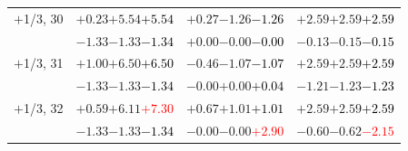 \documentclass[compress]{beamer}
\begin{document}
\begin{frame}
\begin{tabular}{r | c | c | c}
$+$1/3, 30 & $+0.23$\hspace{0.1 cm}$+5.54$\hspace{0.1 cm}\textcolor{black}{$+5.54$} & $+0.27$\hspace{0.1 cm}$-1.26$\hspace{0.1 cm}\textcolor{black}{$-1.26$} & $+2.59$\hspace{0.1 cm}$+2.59$\hspace{0.1 cm}\textcolor{black}{$+2.59$} \\
           & $-1.33$\hspace{0.1 cm}$-1.33$\hspace{0.1 cm}\textcolor{black}{$-1.34$} & $+0.00$\hspace{0.1 cm}$-0.00$\hspace{0.1 cm}\textcolor{black}{$-0.00$} & $-0.13$\hspace{0.1 cm}$-0.15$\hspace{0.1 cm}\textcolor{black}{$-0.15$} \\
$+$1/3, 31 & $+1.00$\hspace{0.1 cm}$+6.50$\hspace{0.1 cm}\textcolor{black}{$+6.50$} & $-0.46$\hspace{0.1 cm}$-1.07$\hspace{0.1 cm}\textcolor{black}{$-1.07$} & $+2.59$\hspace{0.1 cm}$+2.59$\hspace{0.1 cm}\textcolor{black}{$+2.59$} \\
           & $-1.33$\hspace{0.1 cm}$-1.33$\hspace{0.1 cm}\textcolor{black}{$-1.34$} & $-0.00$\hspace{0.1 cm}$+0.00$\hspace{0.1 cm}\textcolor{black}{$+0.04$} & $-1.21$\hspace{0.1 cm}$-1.23$\hspace{0.1 cm}\textcolor{black}{$-1.23$} \\
$+$1/3, 32 & $+0.59$\hspace{0.1 cm}$+6.11$\hspace{0.1 cm}\textcolor{red}{$+7.30$} & $+0.67$\hspace{0.1 cm}$+1.01$\hspace{0.1 cm}\textcolor{black}{$+1.01$} & $+2.59$\hspace{0.1 cm}$+2.59$\hspace{0.1 cm}\textcolor{black}{$+2.59$} \\
           & $-1.33$\hspace{0.1 cm}$-1.33$\hspace{0.1 cm}\textcolor{black}{$-1.34$} & $-0.00$\hspace{0.1 cm}$-0.00$\hspace{0.1 cm}\textcolor{red}{$+2.90$} & $-0.60$\hspace{0.1 cm}$-0.62$\hspace{0.1 cm}\textcolor{red}{$-2.15$} \\

\end{tabular}
\end{frame}
\end{document}
